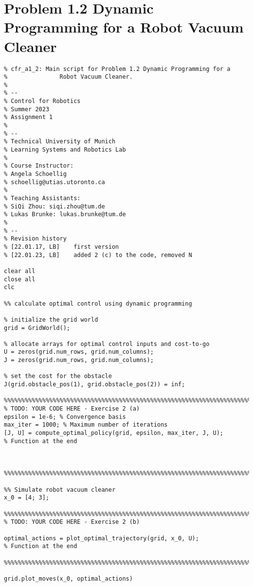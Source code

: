 \documentclass[8pt, a4paper, oneside, justified]{article}
\numberwithin{equation}{section}
\begin{document}
\section*{Problem 1.2 Dynamic Programming for a Robot Vacuum Cleaner}
\setcounter{equation}{0} %

\begin{lstlisting}
% cfr_a1_2: Main script for Problem 1.2 Dynamic Programming for a 
%               Robot Vacuum Cleaner.
%
% --
% Control for Robotics
% Summer 2023
% Assignment 1
%
% --
% Technical University of Munich
% Learning Systems and Robotics Lab
%
% Course Instructor:
% Angela Schoellig
% schoellig@utias.utoronto.ca
%
% Teaching Assistants: 
% SiQi Zhou: siqi.zhou@tum.de
% Lukas Brunke: lukas.brunke@tum.de
%
% --
% Revision history
% [22.01.17, LB]    first version
% [22.01.23, LB]    added 2 (c) to the code, removed N

clear all
close all
clc

%% calculate optimal control using dynamic programming

% initialize the grid world
grid = GridWorld();

% allocate arrays for optimal control inputs and cost-to-go 
U = zeros(grid.num_rows, grid.num_columns);
J = zeros(grid.num_rows, grid.num_columns);

% set the cost for the obstacle
J(grid.obstacle_pos(1), grid.obstacle_pos(2)) = inf;

%%%%%%%%%%%%%%%%%%%%%%%%%%%%%%%%%%%%%%%%%%%%%%%%%%%%%%%%%%%%%%%%%%%%%%%%%%%
% TODO: YOUR CODE HERE - Exercise 2 (a)
epsilon = 1e-6; % Convergence basis
max_iter = 1000; % Maximum number of iterations
[J, U] = compute_optimal_policy(grid, epsilon, max_iter, J, U);
% Function at the end



%%%%%%%%%%%%%%%%%%%%%%%%%%%%%%%%%%%%%%%%%%%%%%%%%%%%%%%%%%%%%%%%%%%%%%%%%%%

%% Simulate robot vacuum cleaner
x_0 = [4; 3];

%%%%%%%%%%%%%%%%%%%%%%%%%%%%%%%%%%%%%%%%%%%%%%%%%%%%%%%%%%%%%%%%%%%%%%%%%%%
% TODO: YOUR CODE HERE - Exercise 2 (b)

optimal_actions = plot_optimal_trajectory(grid, x_0, U);
% Function at the end

%%%%%%%%%%%%%%%%%%%%%%%%%%%%%%%%%%%%%%%%%%%%%%%%%%%%%%%%%%%%%%%%%%%%%%%%%%%

grid.plot_moves(x_0, optimal_actions)


\end{lstlisting}
\end{document}
